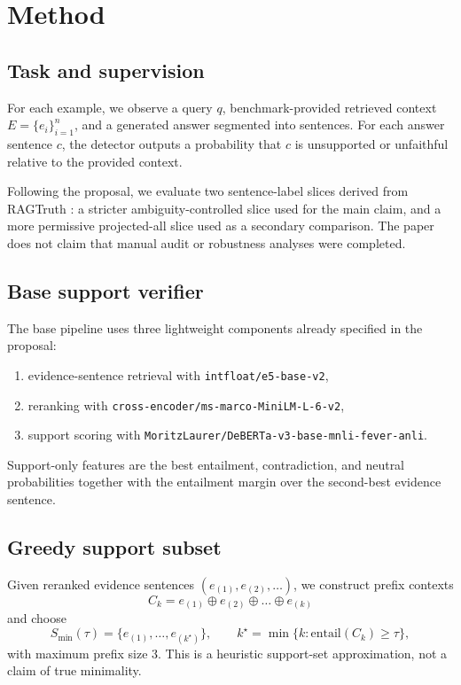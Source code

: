 \documentclass{article}
\newcommand{\smin}{S_{\mathrm{min}}}
\newcommand{\tauv}{\tau}
\begin{document}
\section{Method}
\label{sec:method}
\subsection{Task and supervision}
For each example, we observe a query $q$, benchmark-provided retrieved context $E=\{e_i\}_{i=1}^{n}$, and a generated answer segmented into sentences. For each answer sentence $c$, the detector outputs a probability that $c$ is unsupported or unfaithful relative to the provided context.

Following the proposal, we evaluate two sentence-label slices derived from RAGTruth \citep{niu-etal-2024-ragtruth}: a stricter ambiguity-controlled slice used for the main claim, and a more permissive projected-all slice used as a secondary comparison. The paper does not claim that manual audit or robustness analyses were completed.

\subsection{Base support verifier}
The base pipeline uses three lightweight components already specified in the proposal:
\begin{enumerate}[leftmargin=1.2em]
  \item evidence-sentence retrieval with \texttt{intfloat/e5-base-v2},
  \item reranking with \texttt{cross-encoder/ms-marco-MiniLM-L-6-v2},
  \item support scoring with \texttt{MoritzLaurer/DeBERTa-v3-base-mnli-fever-anli}.
\end{enumerate}
Support-only features are the best entailment, contradiction, and neutral probabilities together with the entailment margin over the second-best evidence sentence.

\subsection{Greedy support subset}
Given reranked evidence sentences $(e_{(1)}, e_{(2)}, \dots)$, we construct prefix contexts
\[
C_k = e_{(1)} \oplus e_{(2)} \oplus \dots \oplus e_{(k)}
\]
and choose
\[
\smin(\tauv) = \{e_{(1)}, \dots, e_{(k^\star)}\}, \qquad
k^\star = \min\{k : \mathrm{entail}(C_k) \ge \tauv\},
\]
with maximum prefix size $3$. This is a heuristic support-set approximation, not a claim of true minimality.
\end{document}
